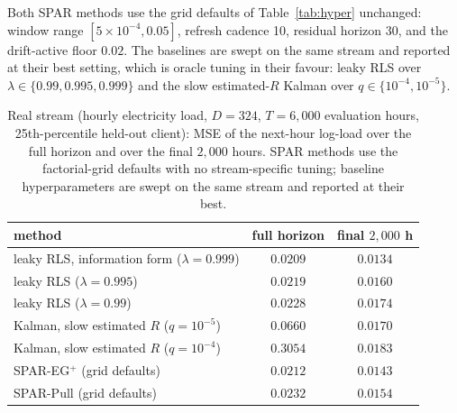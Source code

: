 \documentclass[11pt]{article}
\begin{document}
Both SPAR methods use the grid defaults of Table~\ref{tab:hyper} unchanged: window range $[5 \times 10^{-4}, 0.05]$, refresh cadence 10, residual horizon 30, and the drift-active floor $0.02$.
The baselines are swept on the same stream and reported at their best setting, which is oracle tuning in their favour: leaky RLS over $\lambda \in \{0.99, 0.995, 0.999\}$ and the slow estimated-$R$ Kalman over $q \in \{10^{-4}, 10^{-5}\}$.

\begin{table}[!htbp]
\centering
\footnotesize
\setlength{\tabcolsep}{5pt}
\caption{Real stream (hourly electricity load, $D = 324$, $T = 6{,}000$ evaluation hours, 25th-percentile held-out client): MSE of the next-hour log-load over the full horizon and over the final $2{,}000$ hours.
SPAR methods use the factorial-grid defaults with no stream-specific tuning; baseline hyperparameters are swept on the same stream and reported at their best.}
\label{tab:electricity}
\begin{tabular}{lcc}
\toprule
method & full horizon & final $2{,}000$ h \\
\midrule
leaky RLS, information form ($\lambda = 0.999$) & $\mathbf{0.0209}$ & $\mathbf{0.0134}$ \\
leaky RLS ($\lambda = 0.995$) & $0.0219$ & $0.0160$ \\
leaky RLS ($\lambda = 0.99$) & $0.0228$ & $0.0174$ \\
Kalman, slow estimated $R$ ($q = 10^{-5}$) & $0.0660$ & $0.0170$ \\
Kalman, slow estimated $R$ ($q = 10^{-4}$) & $0.3054$ & $0.0183$ \\
\midrule
SPAR-EG$^+$ (grid defaults) & $0.0212$ & $0.0143$ \\
SPAR-Pull (grid defaults) & $0.0232$ & $0.0154$ \\
\bottomrule
\end{tabular}
\end{table}
\end{document}
